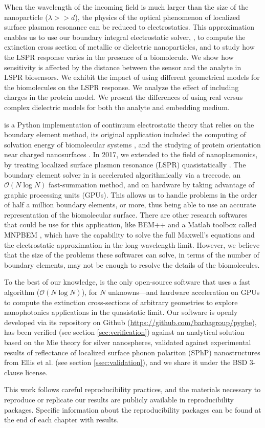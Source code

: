 When the wavelength of the incoming field is much larger than the size of the nanoparticle ($\lambda>>d$), the physics of the optical phenomenon of 
localized surface plasmon resonance can be reduced to electrostatics. This approximation enables us to use our boundary integral 
electrostatic solver, \pygbe, to compute the extinction cross section of metallic or dielectric nanoparticles, and to study how the LSPR response varies in the 
presence of a biomolecule. We show how sensitivity is affected by the distance between the sensor and the analyte in LSPR biosensors. We exhibit the impact 
of using different geometrical models for the biomolecules on the LSPR response. We analyze the effect of including charges in the protein model. We present 
the differences of using real versus complex dielectric models for both the analyte and embedding medium.

\pygbe is a Python implementation of continuum electrostatic theory that relies on the boundary element method, its original application included 
the computing of solvation energy of biomolecular systems \cite{CooperBardhanBarba2013}, and the studying of protein orientation near charged 
nanosurfaces \cite{CooperClementiBarba2015}. In 2017, we extended \pygbe to the field of nanoplasmonics, by treating localized surface plasmon resonance 
(LSPR) quasistatically \cite{ClementiETal2017}. The boundary element solver in \pygbe is accelerated algorithmically via a treecode, an $\mathcal{O}(N\log N)$ 
fast-summation method, and on hardware by taking advantage of graphic processing units (GPUs). This allows us to handle problems in the order of half a million 
boundary elements, or more, thus being able to use an accurate representation of the biomolecular surface. There are other research softwares that could be use 
for this application, like BEM++ \cite{SmigajETal2015} and a Matlab toolbox called MNPBEM \cite{HohenesterTrugler2012}, which have the capability to solve the 
full Maxwell's equations and the electrostatic approximation in the long-wavelength limit. However, we believe that the size of the
problems these softwares can solve, in terms of the number of boundary elements,  may not be enough to resolve the details of the biomolecules.

 
To the best of our knowledge, \pygbe is the only open-source software that uses a fast algorithm ($\mathcal{O}(N\log N)$),
for $N$ unknowns—and hardware acceleration on GPUs to compute the extinction cross-sections of arbitrary geometries to explore
nanophotonics applications in the quasistatic limit. Our software is openly developed via its repository on 
Github (\url{https://github.com/barbagroup/pygbe}), has been verified (see section \ref{sec:verification}) against an analytical solution based 
on the Mie theory for silver nanospheres, validated against experimental results of reflectance of localized surface phonon polariton 
(SPhP) nanostructures from Ellis et al. (see section \ref{ssec:validation}), and we share it under the BSD 3-clause license.

This work follows careful reproducibility practices, and the materials necessary to reproduce or replicate our results are publicly available in 
reproducibility packages. Specific information about the reproducibility packages can be found at the end of each chapter with results. 
